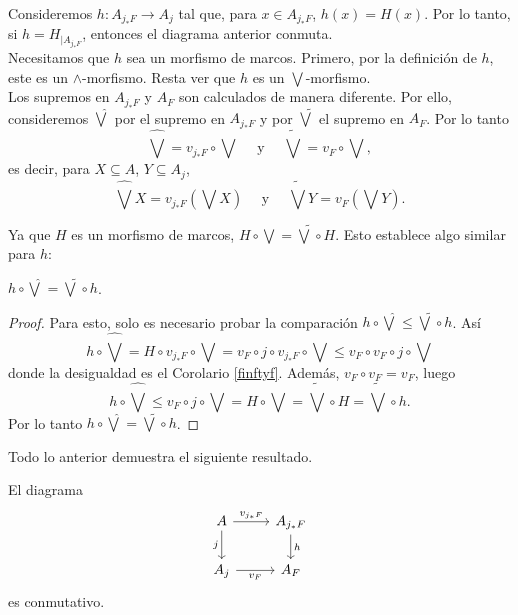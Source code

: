 Consideremos $h\colon A_{j_*F}\to A_j$ tal que, para $x\in A_{j_*F}$, $h(x)=H(x)$. Por lo tanto, si $h=H_{\mid{A_{j_*F}}}$, entonces el diagrama anterior conmuta.\\

Necesitamos que $h$ sea un morfismo de marcos. Primero, por la definición de $h$, este es un $\wedge$-morfismo. Resta ver que $h$ es un $\bigvee$-morfismo.\\

Los supremos en $A_{j_*F}$ y $A_F$ son calculados de manera diferente. Por ello, consideremos $\hat{\bigvee}$ por el supremo en $A_{j_*F}$ y por $\tilde{\bigvee}$ el supremo en $A_F$. Por lo tanto
\[
\hat{\bigvee}=v_{j_*F}\circ \bigvee\quad\mbox{ y }\quad \tilde{\bigvee}=v_{F}\circ \bigvee,
\] 
es decir, para $X\subseteq A$, $Y\subseteq A_j$,
\[
	\hat{\bigvee}X=v_{j_*F}(\bigvee X)\quad\mbox{ y }\quad \tilde{\bigvee}Y=v_{F}(\bigvee Y).
\]

Ya que $H$ es un morfismo de marcos, $H\circ \bigvee=\tilde{\bigvee}\circ H$. Esto establece algo similar para $h$:

\begin{lem}\label{bigvee g}
$h\circ \hat{\bigvee}=\tilde{\bigvee}\circ h$.
\end{lem}

\begin{proof}
Para esto, solo es necesario probar la comparación $h\circ \hat{\bigvee}\leq \tilde{\bigvee}\circ h$. Así
\[
h\circ \hat{\bigvee}=H\circ v_{j_*F}\circ \bigvee=v_F\circ j\circ v_{j_*F}\circ \bigvee\leq v_F\circ v_F\circ j\circ \bigvee
\]
donde la desigualdad es el Corolario \ref{finftyf}. Además, $v_F\circ v_F=v_F$, luego
\[
h\circ\hat{\bigvee}\leq v_F\circ j\circ \bigvee =H\circ \bigvee=\tilde{\bigvee}\circ H=\tilde{\bigvee}\circ h.
\]
Por lo tanto $h\circ\hat{\bigvee}=\tilde{\bigvee}\circ h$.
\end{proof}

Todo lo anterior demuestra el siguiente resultado.

\begin{prop}\label{VFsquare}
El diagrama
\[\begin{tikzcd}
	A & {A_{j_*F}} \\
	{A_j} & {A_F}
	\arrow["{v_{j_*F}}", from=1-1, to=1-2]
	\arrow["j"', from=1-1, to=2-1]
	\arrow["h", from=1-2, to=2-2]
	\arrow["{v_F}"', from=2-1, to=2-2]
\end{tikzcd}\]
es conmutativo.
\end{prop}

